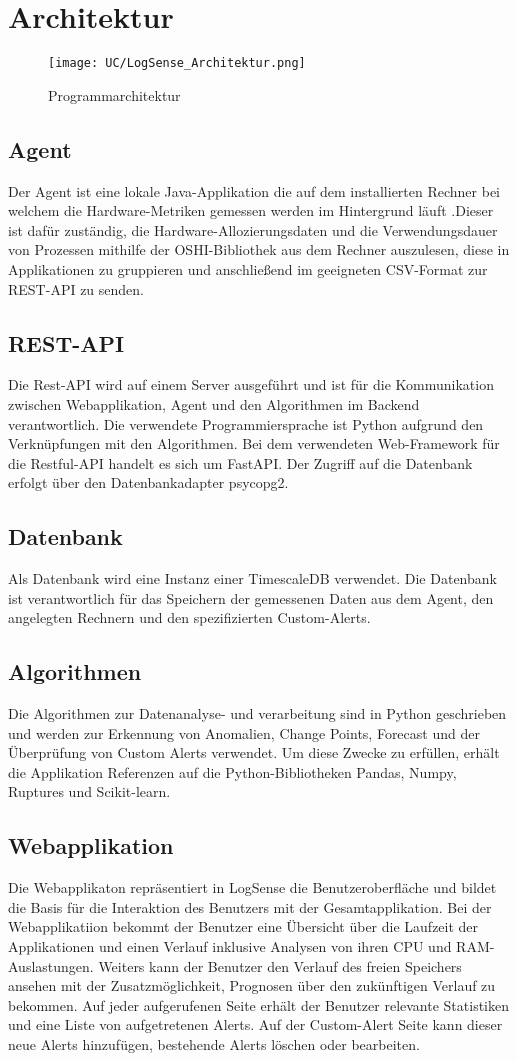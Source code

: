 \documentclass{report}
\begin{document}
\section{Architektur}
\begin{figure}[H]
    \centering
    \texttt{[image: UC/LogSense\_Architektur.png]}
    \caption{Programmarchitektur}
\end{figure}
\subsection{Agent}
Der Agent ist eine lokale Java-Applikation die auf dem installierten Rechner bei welchem die Hardware-Metriken gemessen werden im Hintergrund läuft .Dieser ist dafür zuständig, die Hardware-Allozierungsdaten und die Verwendungsdauer von Prozessen mithilfe der OSHI-Bibliothek aus dem Rechner auszulesen, diese in Applikationen zu gruppieren und anschließend im geeigneten CSV-Format zur REST-API zu senden.
\subsection{REST-API}
Die Rest-API wird auf einem Server ausgeführt und ist für die Kommunikation zwischen Webapplikation, Agent und den Algorithmen im Backend verantwortlich. Die verwendete Programmiersprache ist Python aufgrund den Verknüpfungen mit den Algorithmen. Bei dem verwendeten Web-Framework für die Restful-API handelt es sich um FastAPI. Der Zugriff auf die Datenbank erfolgt über den Datenbankadapter psycopg2.
\subsection{Datenbank}
Als Datenbank wird eine Instanz einer TimescaleDB verwendet. Die Datenbank ist verantwortlich für das Speichern der gemessenen Daten aus dem Agent, den angelegten Rechnern und den spezifizierten Custom-Alerts. 
\subsection{Algorithmen}
Die Algorithmen zur Datenanalyse- und verarbeitung sind in Python geschrieben und werden zur Erkennung von Anomalien, Change Points, Forecast und der Überprüfung von Custom Alerts verwendet. Um diese Zwecke zu erfüllen, erhält die Applikation Referenzen auf die Python-Bibliotheken Pandas, Numpy, Ruptures und Scikit-learn.
\subsection{Webapplikation}
Die Webapplikaton repräsentiert in LogSense die Benutzeroberfläche und bildet die Basis für die Interaktion des Benutzers mit der Gesamtapplikation. Bei der Webapplikatiion bekommt der Benutzer eine Übersicht über die Laufzeit der Applikationen und einen Verlauf inklusive Analysen von ihren CPU und RAM-Auslastungen. Weiters kann der Benutzer den Verlauf des freien Speichers ansehen mit der Zusatzmöglichkeit, Prognosen über den zukünftigen Verlauf zu bekommen. Auf jeder aufgerufenen Seite erhält der Benutzer relevante Statistiken und eine Liste von aufgetretenen Alerts. Auf der Custom-Alert Seite kann dieser neue Alerts hinzufügen, bestehende Alerts löschen oder bearbeiten. 
\end{document}
